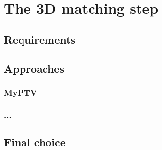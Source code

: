 \chapter{The 3D matching step}
\label{chap:matching}

\section{Requirements}
\section{Approaches}
\subsection{MyPTV}
\subsection{...}
\section{Final choice}
